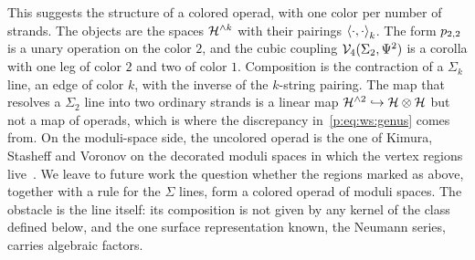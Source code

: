 This suggests the structure of a colored operad, with one color per number of strands.
The objects are the spaces $\Hn{k}$ with their pairings $\pair[k]{\cdot}{\cdot}$.
The form $\sprod{2}{2}$ is a unary operation on the color $2$, and the cubic coupling $\vertex{4}(\Sigma_2, \Psi^2)$ is a corolla with one leg of color $2$ and two of color $1$.
Composition is the contraction of a $\Sigma_k$ line, an edge of color $k$, with the inverse of the $k$-string pairing.
The map that resolves a $\Sigma_2$ line into two ordinary strands is a linear map $\Hn{2} \hookrightarrow \Hs \otimes \Hs$ but not a map of operads, which is where the discrepancy in~\eqref{p:eq:ws:genus} comes from.
On the moduli-space side, the uncolored operad is the one of Kimura, Stasheff and Voronov on the decorated moduli spaces in which the vertex regions live~\cite{Kimura:1995:OperadStructuresModuli}.
We leave to future work the question whether the regions marked as above, together with a rule for the $\Sigma$ lines, form a colored operad of moduli spaces.
The obstacle is the line itself: its composition is not given by any kernel of the class defined below, and the one surface representation known, the Neumann series, carries algebraic factors.

